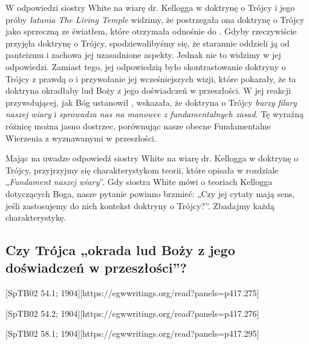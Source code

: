 
W odpowiedzi siostry White na wiarę dr. Kellogga w doktrynę o Trójcy i jego próby \textit{łatania} \textit{The Living Temple} widzimy, że postrzegała ona doktrynę o Trójcy jako sprzeczną ze światłem, które otrzymała odnośnie do . Gdyby rzeczywiście przyjęła doktrynę o Trójcy, spodziewalibyśmy się, że starannie oddzieli ją od panteizmu i zachowa jej uzasadnione aspekty. Jednak nie to widzimy w jej odpowiedzi. Zamiast tego, jej odpowiedzią było skontrastowanie doktryny o Trójcy z prawdą o  i przywołanie jej wcześniejszych wizji, które pokazały, że ta doktryna okradłaby lud Boży z jego doświadczeń w przeszłości. W jej reakcji przywołującej, jak Bóg ustanowił , wskazała, że doktryna o Trójcy \textit{burzy filary naszej wiary} i \textit{sprowadza nas na manowce z fundamentalnych zasad}. Tę wyraźną różnicę można jasno dostrzec, porównując nasze obecne Fundamentalne Wierzenia z  wyznawanymi w przeszłości.

Mając na uwadze odpowiedź siostry White na wiarę dr. Kellogga w doktrynę o Trójcy, przyjrzyjmy się charakterystykom teorii, które opisała w rozdziale „\textit{Fundament naszej wiary}”. Gdy siostra White mówi o teoriach Kellogga dotyczących Boga, nasze pytanie powinno brzmieć: „Czy jej cytaty mają sens, jeśli zastosujemy do nich kontekst doktryny o Trójcy?”. Zbadajmy każdą charakterystykę.

\subsection*{Czy Trójca „okrada lud Boży z jego doświadczeń w przeszłości”?}

[SpTB02 54.1; 1904][https://egwwritings.org/read?panels=p417.275]

[SpTB02 54.2; 1904][https://egwwritings.org/read?panels=p417.276]

[SpTB02 58.1; 1904][https://egwwritings.org/read?panels=p417.295]

